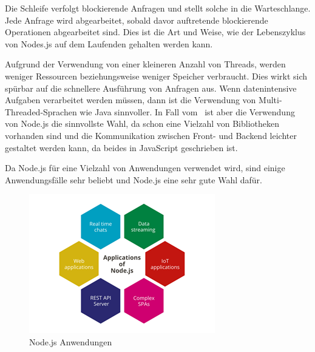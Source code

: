 Die Schleife verfolgt blockierende Anfragen und stellt solche in die Warteschlange. Jede Anfrage wird abgearbeitet, sobald davor auftretende blockierende Operationen abgearbeitet sind. Dies ist die Art und Weise, wie der Lebenszyklus von Nodes.js auf dem Laufenden gehalten werden kann. \cite{NodeJsArch}\cite{NodeJsArch2}

Aufgrund der Verwendung von einer kleineren Anzahl von Threads, werden weniger Ressourcen beziehungsweise weniger Speicher verbraucht. Dies wirkt sich spürbar auf die schnellere Ausführung von Anfragen aus. Wenn datenintensive Aufgaben verarbeitet werden müssen, dann ist die Verwendung von Multi-Threaded-Sprachen wie Java sinnvoller. In Fall vom \ZELIA\ ist aber die Verwendung von Node.js die sinnvollste Wahl, da schon eine Vielzahl von Bibliotheken vorhanden sind und die Kommunikation zwischen Front- und Backend leichter gestaltet werden kann, da beides in JavaScript geschrieben ist. \cite{Arocom}\cite{NodeJsArch2}\cite{NodeJsArch}


Da Node.js für eine Vielzahl von Anwendungen verwendet wird, sind einige Anwendungsfälle sehr beliebt und Node.js eine sehr gute Wahl dafür.

\begin{figure}[H]
    \centering
    \includegraphics{media/NodeJs/NodeJsAnwendungen.png}
    \caption{Node.js Anwendungen \cite{AnwendungenFoto}}
\end{figure}

